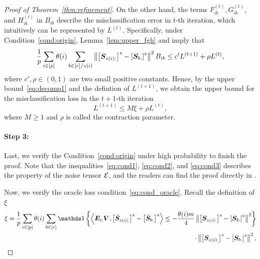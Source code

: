 \documentclass[lettersize,journal]{IEEEtran}
\theoremstyle{definition}
\theoremstyle{definition}
\newcommand{\off}[1]{\left[#1\right]}
\newcommand{\offf}[1]{\left\{#1\right\}}
\newcommand{\ang}[1]{\left\langle#1\right\rangle}
\def\fixme#1#2{\textbf{\color{red}[FIXME (#1): #2]}}
\begin{document}
\begin{proof}[Proof of Theorem~\ref{thm:refinement}]
    On the other hand, the terms $ F_{ib}^{(t)}, G_{ib}^{(t)}$, and $H_{ib}^{(t)}$ in $B_{ib}$ describe the misclassification error in $t$-th iteration, which intuitively can be represented by $L^{(t)}$. Specifically, under Condition~\ref{cond:origin}, Lemma~\ref{lem:upper_fgh} and \citet[Step 4, Proof of Theorem 2]{han2020exact} imply that 
    \begin{equation}
        \frac{1}{p} \sum_{i \in [p] } \theta(i) \sum_{b \in [r]/z(i)}  \onorm{ \off{ \mS_{ z(i):}  }^s - \off{ \mS_{b:}  }^s  }^2 B_{ib} \leq c' L^{(t+1)} + \rho L^{(t)},
    \end{equation}
    where $c', \rho \in (0,1)$ are two small positive constants. Hence, by the upper bound~\eqref{eq:decomp1} and the defintion of $L^{(t+1)}$, we obtain the upper bound for the misclassification loss in the $t+1$-th iteration
    \begin{equation}\label{eq:decomp_t}
        L^{(t+1)} \leq M \xi + \rho L^{(t)},
    \end{equation}
    where $M \geq 1$ and $\rho$ is called the contraction parameter.  
    
    \paragraph{Step 3:} Last, we verify the Condition~\ref{cond:origin} under high probability to finish the proof. Note that the inequalities~\eqref{eq:cond1}, \eqref{eq:cond2}, and \eqref{eq:cond3} describes the property of the noise tensor $\mathcal{E}$, and the readers can find the proof directly in \citet[Step 5, Proof of Theorem 2]{han2020exact}.  
    
    Now, we verify the oracle loss condition~\eqref{eq:cond_oracle}. Recall the definition of $\xi$
    \begin{align}
        \xi = \frac{1}{p} \sum_{i \in [p]} \theta(i) \sum_{b \in [r]} \ind \offf{  \ang{ \mE_{i:} \mV, \off{  \tilde \mS_{z(i):} }^s - \off{  \tilde \mS_{b:} }^s }  \leq - \frac{\theta(i) m}{4} \onorm{ \off{ \mS_{z(i):}  }^s - \off{ \mS_{b:}  }^s  }^2 }\\
        \cdot \onorm{ \off{ \mS_{z(i):}  }^s - \off{ \mS_{ b:}  }^s  }^2,
    \end{align}


\end{proof}
\end{document}

